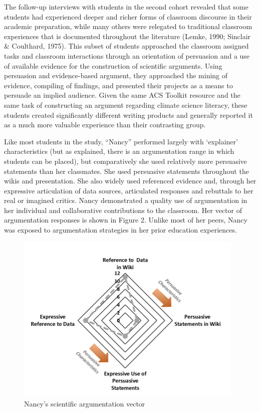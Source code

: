 \documentclass[11.5pt]{sig-alternate} %
\begin{document}
\begin{large}
The follow-up interviews with students in the second cohort revealed that some students had experienced deeper and richer forms of classroom discourse in their academic preparation, while many others were relegated to traditional classroom experiences that is documented throughout the literature (Lemke, 1990; Sinclair \& Coulthard, 1975). This subset of students approached the classroom assigned tasks and classroom interactions through an orientation of persuasion and a use of available evidence for the construction of scientific arguments. Using persuasion and evidence-based argument, they approached the mining of evidence, compiling of findings, and presented their projects as a means to persuade an implied audience. Given the same ACS Toolkit resource and the same task of constructing an argument regarding climate science literacy, these students created significantly different writing products and generally reported it as a much more valuable experience than their contrasting group. 

Like most students in the study, “Nancy” performed largely with ‘explainer’ characteristics (but as explained, there is an argumentation range in which students can be placed), but comparatively she used relatively more persuasive statements than her classmates. She used persuasive statements throughout the wikis and presentation. She also widely used referenced evidence and, through her expressive articulation of data sources, articulated responses and rebuttals to her real or imagined critics. Nancy demonstrated a quality use of argumentation in her individual and collaborative contributions to the classroom. Her vector of argumentation responses is shown in Figure 2. Unlike most of her peers, Nancy was exposed to argumentation strategies in her prior education experiences.

\begin{figure}[h]
    \centering
    \includegraphics[width=1\linewidth]{Fig 2.png}
    \caption{Nancy’s scientific argumentation vector}
\end{figure}


\end{large}
\end{document}

